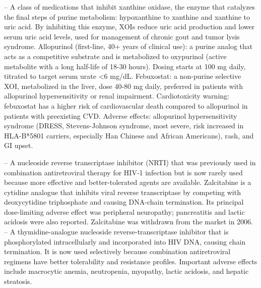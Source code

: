-- A class of medications that inhibit xanthine oxidase, the enzyme that catalyzes the final steps of purine metabolism: hypoxanthine to xanthine and xanthine to uric acid. By inhibiting this enzyme, XOIs reduce uric acid production and lower serum uric acid levels, used for management of chronic gout and tumor lysis syndrome. Allopurinol (first-line, 40+ years of clinical use): a purine analog that acts as a competitive substrate and is metabolized to oxypurinol (active metabolite with a long half-life of 18-30 hours). Dosing starts at 100 mg daily, titrated to target serum urate <6 mg/dL. Febuxostat: a non-purine selective XOI, metabolized in the liver, dose 40-80 mg daily, preferred in patients with allopurinol hypersensitivity or renal impairment. Cardiotoxicity warning: febuxostat has a higher risk of cardiovascular death compared to allopurinol in patients with preexisting CVD. Adverse effects: allopurinol hypersensitivity syndrome (DRESS, Stevens-Johnson syndrome, most severe, risk increased in HLA-B*5801 carriers, especially Han Chinese and African Americans), rash, and GI upset.

-- A nucleoside reverse transcriptase inhibitor (NRTI) that was previously used in combination antiretroviral therapy for HIV-1 infection but is now rarely used because more effective and better-tolerated agents are available. Zalcitabine is a cytidine analogue that inhibits viral reverse transcriptase by competing with deoxycytidine triphosphate and causing DNA-chain termination. Its principal dose-limiting adverse effect was peripheral neuropathy; pancreatitis and lactic acidosis were also reported. Zalcitabine was withdrawn from the market in 2006.
-- A thymidine-analogue nucleoside reverse-transcriptase inhibitor that is phosphorylated intracellularly and incorporated into HIV DNA, causing chain termination. It is now used selectively because combination antiretroviral regimens have better tolerability and resistance profiles. Important adverse effects include macrocytic anemia, neutropenia, myopathy, lactic acidosis, and hepatic steatosis.
